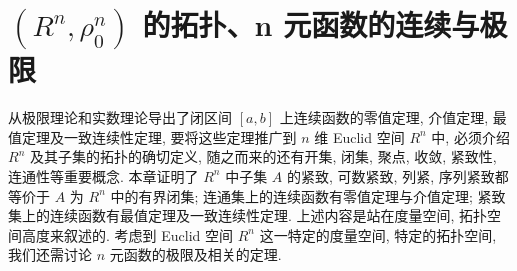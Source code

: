 
\chapter{\texorpdfstring{$(R^n, \rho_0^n)$}{(R^n, ρ)} 的拓扑、n 元函数的连续与极限}\label{ch:7}

从极限理论和实数理论导出了闭区间 $[a, b]$ 上连续函数的零值定理, 介值定理, 最值定理及一致连续性定理, 要将这些定理推广到 $n$ 维 Euclid 空间 $R^n$ 中, 必须介绍 $R^n$ 及其子集的拓扑的确切定义, 随之而来的还有开集, 闭集, 聚点, 收敛, 紧致性, 连通性等重要概念. 本章证明了 $R^n$ 中子集 $A$ 的紧致, 可数紧致, 列紧, 序列紧致都等价于 $A$ 为 $R^n$ 中的有界闭集; 连通集上的连续函数有零值定理与介值定理; 紧致集上的连续函数有最值定理及一致连续性定理. 上述内容是站在度量空间, 拓扑空间高度来叙述的. 考虑到 Euclid 空间 $R^n$ 这一特定的度量空间, 特定的拓扑空间, 我们还需讨论 $n$ 元函数的极限及相关的定理.








